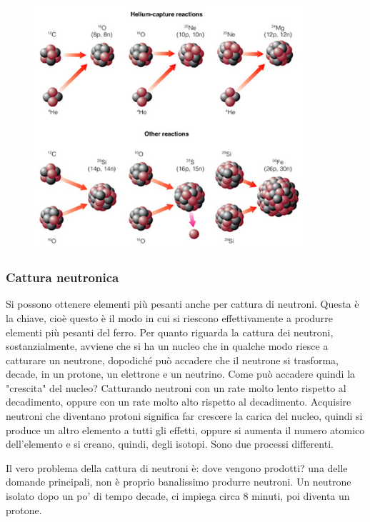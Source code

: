 \begin{figure}[H]
    \centering
    \includegraphics[width=10cm]{lezione 28 novembre/processialpha.png}
    \label{lezione 28 novembre/processialpha.png}
\end{figure}

\subsubsection{Cattura neutronica}
Si possono ottenere elementi più pesanti anche per cattura di neutroni. Questa è la chiave, cioè questo è il modo in cui si riescono effettivamente a produrre elementi più pesanti del ferro. Per quanto riguarda la cattura dei neutroni, sostanzialmente, avviene che si ha un nucleo che in qualche modo riesce a catturare un neutrone, dopodiché può accadere che il neutrone si trasforma, decade, in un protone, un elettrone e un neutrino. Come può accadere quindi la "crescita" del nucleo? Catturando neutroni con un rate molto lento rispetto al decadimento, oppure con un rate molto alto rispetto al decadimento. Acquisire neutroni che diventano protoni significa far crescere la carica del nucleo, quindi si produce un altro elemento a tutti gli effetti, oppure si aumenta il numero atomico dell'elemento e si creano, quindi, degli isotopi. Sono due processi differenti.

Il vero problema della cattura di neutroni è: dove vengono prodotti? \E una delle domande principali, non è proprio banalissimo produrre neutroni. Un neutrone isolato dopo un po' di tempo decade, ci impiega circa 8 minuti, poi diventa un protone.

